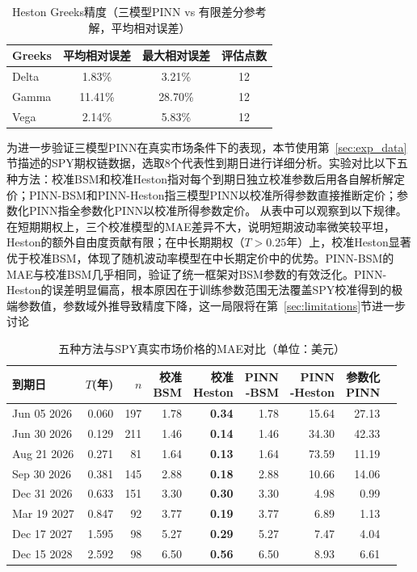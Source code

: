 \begin{table}[htbp]
  \centering
  \caption{Heston Greeks精度（三模型PINN vs 有限差分参考解，平均相对误差）}
  \label{tab:greeks_heston}
  \begin{tabular}{lccc}
    \hline
    Greeks & 平均相对误差 & 最大相对误差 & 评估点数 \\
    \hline
    Delta & 1.83\% & 3.21\% & 12 \\
    Gamma & 11.41\% & 28.70\% & 12 \\
    Vega  & 2.14\% & 5.83\% & 12 \\
    \hline
  \end{tabular}
\end{table}

为进一步验证三模型PINN在真实市场条件下的表现，本节使用第~\ref{sec:exp_data}节描述的SPY期权链数据，选取8个代表性到期日进行详细分析。实验对比以下五种方法：校准BSM和校准Heston指对每个到期日独立校准参数后用各自解析解定价；PINN-BSM和PINN-Heston指三模型PINN以校准所得参数直接推断定价；参数化PINN指全参数化PINN以校准所得参数定价。
从表中可以观察到以下规律。在短期期权上，三个校准模型的MAE差异不大，说明短期波动率微笑较平坦，Heston的额外自由度贡献有限；在中长期期权（$T>0.25$年）上，校准Heston显著优于校准BSM，体现了随机波动率模型在中长期定价中的优势。PINN-BSM的MAE与校准BSM几乎相同，验证了统一框架对BSM参数的有效泛化。PINN-Heston的误差明显偏高，根本原因在于训练参数范围无法覆盖SPY校准得到的极端参数值，参数域外推导致精度下降，这一局限将在第~\ref{sec:limitations}节进一步讨论

\begin{table}[htbp]
  \centering
  \caption{五种方法与SPY真实市场价格的MAE对比（单位：美元）}
  \label{tab:market_results}
  \begin{tabular}{lrrrrrrrr}
    \hline
    到期日 & $T$(年) & $n$ & \makecell{校准\\BSM} & \makecell{校准\\Heston} & \makecell{PINN\\-BSM} & \makecell{PINN\\-Heston} & \makecell{参数化\\PINN} \\
    \hline
    Jun 05 2026 & 0.060 & 197 & 1.78 & \textbf{0.34} & 1.78 & 15.64 & 27.13 \\
    Jun 30 2026 & 0.129 & 211 & 1.46 & \textbf{0.14} & 1.46 & 34.30 & 42.33 \\
    Aug 21 2026 & 0.271 &  81 & 1.64 & \textbf{0.13} & 1.64 & 73.59 & 11.19 \\
    Sep 30 2026 & 0.381 & 145 & 2.88 & \textbf{0.18} & 2.88 & 10.66 & 14.06 \\
    Dec 31 2026 & 0.633 & 151 & 3.30 & \textbf{0.30} & 3.30 &  4.98 &  0.99 \\
    Mar 19 2027 & 0.847 &  92 & 3.77 & \textbf{0.19} & 3.77 &  6.89 &  1.13 \\
    Dec 17 2027 & 1.595 &  98 & 5.27 & \textbf{0.29} & 5.27 &  7.47 &  4.04 \\
    Dec 15 2028 & 2.592 &  98 & 6.50 & \textbf{0.56} & 6.50 &  8.93 &  6.61 \\
    \hline
  \end{tabular}
\end{table}

